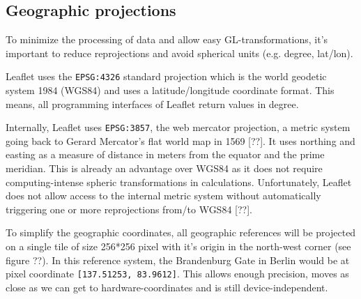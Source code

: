     \subsection{Geographic projections}
      \label{sec:conct:preli:gproj}
      To minimize the processing of data and allow easy GL-transformations, it's important to reduce reprojections and avoid spherical units (e.g. degree, lat/lon).\par
      Leaflet uses the \texttt{EPSG:4326} standard projection which is the world geodetic system 1984 (WGS84) and uses a latitude/longitude coordinate format. This means, all programming interfaces of Leaflet return values in degree.\par
      Internally, Leaflet uses \texttt{EPSG:3857}, the web mercator projection, a metric system going back to Gerard Mercator's flat world map in 1569 [??]. It uses northing and easting as a measure of distance in meters from the equator and the prime meridian. This is already an advantage over WGS84 as it does not require computing-intense spheric transformations in calculations. Unfortunately, Leaflet does not allow access to the internal metric system without automatically triggering one or more reprojections from/to WGS84 [??].\par


      To simplify the geographic coordinates, all geographic references will be projected on a single tile of size 256*256 pixel with it's origin in the north-west corner (see figure ??). In this reference system, the Brandenburg Gate in Berlin would be at pixel coordinate \texttt{[137.51253, 83.9612]}. This allows enough precision, moves as close as we can get to hardware-coordinates and is still device-independent.\par

